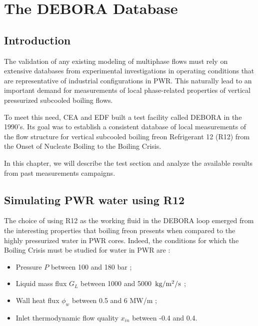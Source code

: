 
\chapter{The DEBORA Database} %

\section{Introduction}

\label{ch:debora} %

The validation of any existing modeling of multiphase flows must rely on extensive databases from experimental investigations in operating conditions that are representative of industrial configurations in PWR. This naturally lead to an important demand for measurements of local phase-related properties of vertical pressurized subcooled boiling flows. 

\npar
To meet this need, CEA and EDF built a test facility called DEBORA in the 1990's. Its goal was to establish a consistent database of local measurements of the flow structure for vertical subcooled boiling freon Refrigerant 12 (R12) from the Onset of Nucleate Boiling to the Boiling Crisis.

\npar

In this chapter, we will describe the test section and analyze the available results from past measurements campaigns.


\section{Simulating PWR water using R12}

The choice of using R12 as the working fluid in the DEBORA loop emerged from the interesting properties that boiling freon presents when compared to the highly pressurized water in PWR cores. Indeed, the conditions for which the Boiling Crisis must be studied for water in PWR are :

\begin{itemize}
\item Pressure $P$ between 100 and 180 bar ;
\item Liquid mass flux $G_{L}$ between 1000 and 5000~$\text{kg/m$^{2}$/s}$ ;
\item Wall heat flux $\phi_{w}$ between 0.5 and 6 MW/m ;
\item Inlet thermodynamic flow quality $x_{in}$ between -0.4 and 0.4.
\end{itemize}

